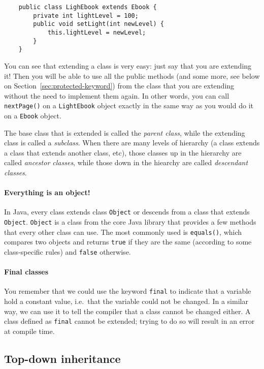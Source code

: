\begin{verbatim}
    public class LighEbook extends Ebook {
        private int lightLevel = 100;
        public void setLight(int newLevel) {
            this.lightLevel = newLevel;
        }
    }
\end{verbatim}

You can see that extending a class is very easy: just say that you are
extending it! Then you will be able to use all the public methods (and
some more, see below on Section~\ref{sec:protected-keyword}) from
the class that you are extending without the need to implement them
again. In other words, you can call \verb+nextPage()+ on a
\verb+LightEbook+ object exactly in the same way as you would do it
on a \verb+Ebook+ object. 

The base class that is extended is called the \emph{parent class},
while the extending class is called a \emph{subclass}. When there are
many levels of hierarchy (a class extends a class that extends another
class, etc), those classes up in the hierarchy are called
\emph{ancestor classes}, while those down in the hiearchy are called
\emph{descendant classes}. 

\paragraph{Everything is an object!}
\label{sec:everything-an-object}

In Java, every class extends class \verb+Object+ or descends from a
class that extends \verb+Object+. \verb+Object+ is a class from the
core Java library that provides a few methods that every other class
can use. The most commonly used is \verb+equals()+, which compares two
objects and returns \verb+true+ if they are the same (according to
some class-specific rules) and \verb+false+ otherwise. 

\paragraph{Final classes}
\label{sec:final-classes}

You remember that we could use the keyword \verb+final+ to indicate
that a variable hold a constant value, i.e.~that the variable could
not be changed. In a similar way, we can use it to tell the compiler
that a class cannot be changed either. A class defined as \verb+final+
cannot be extended; trying to do so will result in an error at compile
time. 


\subsection{Top-down inheritance}
\label{sec:top-down-inheritance}

